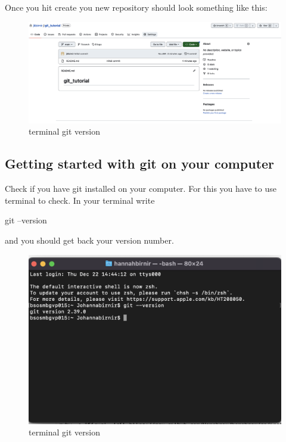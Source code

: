 \documentclass[
  letterpaper,
  DIV=11,
  numbers=noendperiod]{scrartcl}
\begin{document}
Once you hit create you new repository should look something like this:

\begin{figure}

{\centering \includegraphics{figures/4.PNG}

}

\caption{terminal git version}

\end{figure}

\hypertarget{getting-started-with-git-on-your-computer}{%
\subsection{Getting started with git on your
computer}\label{getting-started-with-git-on-your-computer}}

Check if you have git installed on your computer. For this you have to
use terminal to check. In your terminal write

git --version

and you should get back your version number.

\begin{figure}

{\centering \includegraphics{figures/8.PNG}

}

\caption{terminal git version}

\end{figure}
\end{document}
